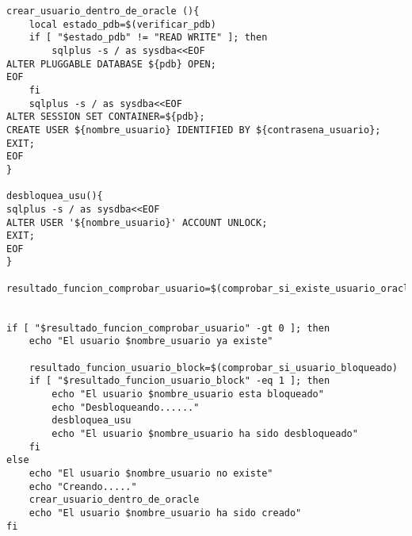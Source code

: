 \documentclass[11pt]{article}
\begin{document}
\begin{verbatim}
crear_usuario_dentro_de_oracle (){
    local estado_pdb=$(verificar_pdb)
    if [ "$estado_pdb" != "READ WRITE" ]; then
        sqlplus -s / as sysdba<<EOF
ALTER PLUGGABLE DATABASE ${pdb} OPEN;
EOF
    fi
    sqlplus -s / as sysdba<<EOF
ALTER SESSION SET CONTAINER=${pdb};
CREATE USER ${nombre_usuario} IDENTIFIED BY ${contrasena_usuario};
EXIT;
EOF
}

desbloquea_usu(){
sqlplus -s / as sysdba<<EOF
ALTER USER '${nombre_usuario}' ACCOUNT UNLOCK;
EXIT;
EOF
}

resultado_funcion_comprobar_usuario=$(comprobar_si_existe_usuario_oracle)


if [ "$resultado_funcion_comprobar_usuario" -gt 0 ]; then
    echo "El usuario $nombre_usuario ya existe"

    resultado_funcion_usuario_block=$(comprobar_si_usuario_bloqueado)
    if [ "$resultado_funcion_usuario_block" -eq 1 ]; then
        echo "El usuario $nombre_usuario esta bloqueado"
        echo "Desbloqueando......"
        desbloquea_usu
        echo "El usuario $nombre_usuario ha sido desbloqueado"
    fi
else
    echo "El usuario $nombre_usuario no existe"
    echo "Creando....."
    crear_usuario_dentro_de_oracle
    echo "El usuario $nombre_usuario ha sido creado"
fi
\end{verbatim}
\end{document}

